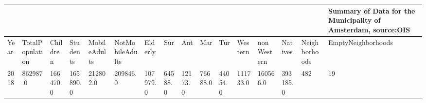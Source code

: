 \begin{tabular}{llllllllllllllll}
\toprule
     &          &          &          &          &          &          &         &         &         &         &          &          &          &     & Summary of Data for the Municipality of Amsterdam, source:OIS \\
\midrule
Year & TotalPopulation & Children & Students & MobileAdults & NotMobileAdults & Elderly & Sur & Ant & Mar & Tur & Western & nonWestern & Natives & Neighborhoods &                                 EmptyNeighborhoods \\
2018 & 862987.0 & 166470.0 & 165890.0 & 212802.0 & 209846.0 & 107979.0 & 64588.0 & 12173.0 & 76688.0 & 44054.0 & 111733.0 & 160566.0 & 393185.0 & 482 &                                                 19 \\
\bottomrule
\end{tabular}
